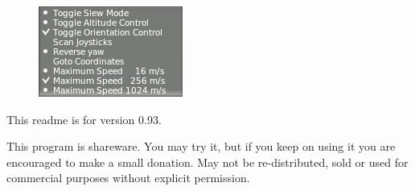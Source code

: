 \documentclass[a4paper,12pt]{article}
\begin{document}
\begin{figure}[h!]%
\centering
\includegraphics[scale=1]{sleworientation.png}
\label{fig:infowindow}
\end{figure}

\vspace{0.5\baselineskip}
This readme is for version 0.93. 

\vspace{0.5\baselineskip} {\color{text1}This program is shareware. You may try
  it, but if you keep on using it you are encouraged to make a small
  donation. May not be re-distributed, sold or used for commercial
  purposes without explicit permission.}
\end{document}
